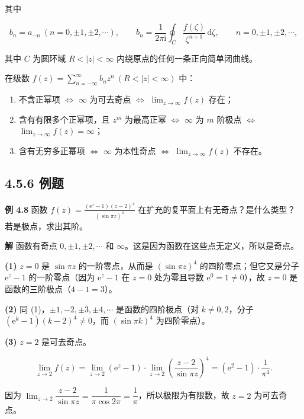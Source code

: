 其中

\[
b_n=a_{-n}\ (n=0,\pm1,\pm2,\cdots),\qquad
b_n=\frac{1}{2\pi\mathrm{i}}\oint_C\frac{f(\zeta)}{\zeta^{n+1}}\,\mathrm{d}\zeta,\qquad n=0,\pm1,\pm2,\cdots,
\]

其中 \(C\) 为圆环域 \(R<|z|<\infty\) 内绕原点的任何一条正向简单闭曲线。

在级数
\(f(z)=\displaystyle\sum_{n=-\infty}^{\infty}b_n z^n\ (R<|z|<\infty)\)
中：

\begin{enumerate}
\def\labelenumi{\arabic{enumi}.}
\tightlist
\item
  不含正幂项 \(\iff\) \(\infty\) 为可去奇点 \(\iff\)
  \(\lim_{z\to\infty}f(z)\) 存在；
\item
  含有有限多个正幂项，且 \(z^m\) 为最高正幂 \(\iff\) \(\infty\) 为 \(m\)
  阶极点 \(\iff\) \(\lim_{z\to\infty}f(z)=\infty\)；
\item
  含有无穷多正幂项 \(\iff\) \(\infty\) 为本性奇点 \(\iff\)
  \(\lim_{z\to\infty}f(z)\) 不存在。
\end{enumerate}

\subsection{4.5.6 例题}\label{ux4f8bux9898-3}

\textbf{例 4.8} 函数
\(\displaystyle f(z)=\frac{(\mathrm{e}^z-1)(z-2)^4}{(\sin\pi z)^4}\)
在扩充的复平面上有无奇点？是什么类型？若是极点，求出其阶。

\textbf{解} 函数有奇点 \(0,\pm1,\pm2,\cdots\) 和
\(\infty\)。这是因为函数在这些点无定义，所以是奇点。

\textbf{(1)} \(z=0\) 是 \(\sin\pi z\) 的一阶零点，从而是
\((\sin\pi z)^4\) 的四阶零点；但它又是分子 \(\mathrm{e}^z-1\)
的一阶零点（因为 \(\mathrm{e}^z-1\) 在 \(z=0\) 处为零且导数
\(\mathrm{e}^0=1\neq 0\)），故 \(z=0\) 是函数的三阶极点（\(4-1=3\)）。

\textbf{(2)} 同 (1)，\(\pm1,-2,\pm3,\pm4,\cdots\) 是函数的四阶极点（对
\(k\neq 0,2\)，分子 \((\mathrm{e}^k-1)(k-2)^4\neq 0\)，而
\((\sin\pi k)^4\) 为四阶零点）。

\textbf{(3)} \(z=2\) 是可去奇点。

\[
\lim_{z\to2}f(z)=\lim_{z\to2}(\mathrm{e}^z-1)\cdot\lim_{z\to2}\left(\frac{z-2}{\sin\pi z}\right)^4
=(\mathrm{e}^2-1)\cdot\frac{1}{\pi^4}.
\]

因为
\(\lim_{z\to2}\dfrac{z-2}{\sin\pi z}=\dfrac{1}{\pi\cos 2\pi}=\dfrac{1}{\pi}\)，所以极限为有限数，故
\(z=2\) 为可去奇点。

